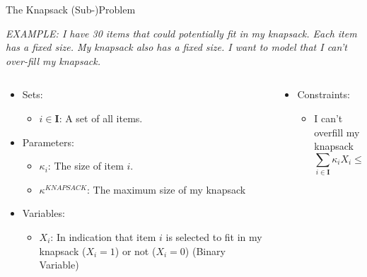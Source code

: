 \documentclass[10pt, aspectratio=169]{beamer}
\begin{document}
\begin{frame}{The Knapsack (Sub-)Problem}
    \begin{center}
        \textit{EXAMPLE: I have 30 items that could potentially fit in my knapsack. Each item has a fixed size. My knapsack also has a fixed size. I want to model that I can't over-fill my knapsack.}
    \end{center}
    \begin{columns}
        \begin{column}{0.5\textwidth}
            \begin{itemize}
                \item Sets:
                \begin{itemize}
                    \item $i \in \textbf{I}$: A set of all items.
                \end{itemize}
                \item Parameters:
                \begin{itemize}
                    \item $\kappa_i$: The size of item $i$.
                    \item $\kappa^{KNAPSACK}$: The maximum size of my knapsack
                \end{itemize}
                \item Variables:
                \begin{itemize}
                    \item $X_{i}$: In indication that item $i$ is selected to fit in my knapsack ($X_i = 1$) or not ($X_i = 0$) (Binary Variable)
                \end{itemize}
            \end{itemize}
        \end{column}
        \begin{column}{0.5\textwidth}
            \begin{itemize}
                \item Constraints:
                \begin{itemize}
                    \item I can't overfill my knapsack
                    $$\sum_{i \in \textbf{I}} \kappa_i X_i \leq \kappa^{KNAPSACK}$$
                \end{itemize}
            \end{itemize}
        \end{column}
    \end{columns}
\end{frame}
\end{document}
